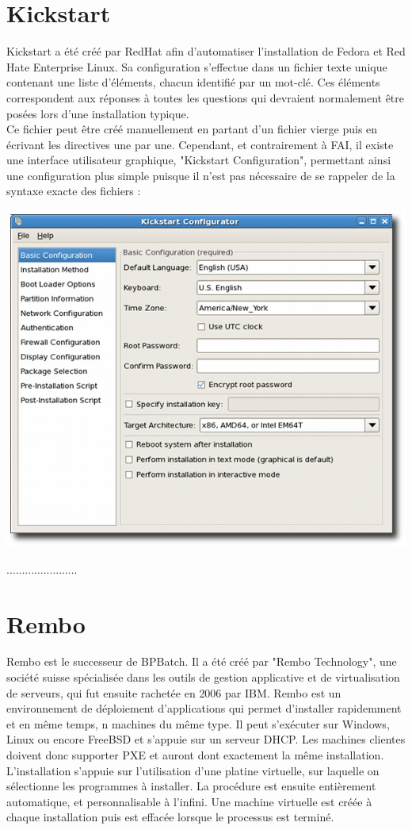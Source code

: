 \documentclass[a4paper,12pt,one side,titlepage]{report}
\begin{document}
\section{Kickstart}
Kickstart a été créé par RedHat afin d'automatiser l'installation de Fedora et Red Hate Enterprise Linux. Sa configuration s'effectue dans un fichier texte unique contenant une liste d'éléments, chacun identifié par un mot-clé. Ces éléments correspondent aux réponses à toutes les questions qui devraient normalement être posées lors d'une installation typique.\\
Ce fichier peut être créé manuellement en partant d'un fichier vierge puis en écrivant les directives une par une.
Cependant, et contrairement à FAI, il existe une interface utilisateur graphique, "Kickstart Configuration", permettant ainsi une configuration plus simple puisque il n'est pas nécessaire de se rappeler de la syntaxe exacte des fichiers :\\
\begin{center}\includegraphics[scale=0.5]{./img/kickstart.png}\end{center}
.......................

\section{Rembo}
Rembo est le successeur de BPBatch. Il a été créé par "Rembo Technology", une société suisse spécialisée dans les outils de gestion applicative et de virtualisation de serveurs, qui fut ensuite rachetée en 2006 par IBM. Rembo est un environnement de déploiement d'applications qui permet d'installer rapidemment et en même temps, n machines du même type. Il peut s’exécuter sur Windows, Linux ou encore FreeBSD et s’appuie sur un serveur DHCP. Les machines clientes doivent donc supporter PXE et auront dont exactement la même installation. L'installation s'appuie sur l'utilisation d'une platine virtuelle, sur laquelle on sélectionne les programmes à installer. La procédure est ensuite entièrement automatique, et personnalisable à l'infini. Une machine virtuelle est créée à chaque installation puis est effacée lorsque le processus est terminé.
\end{document}
